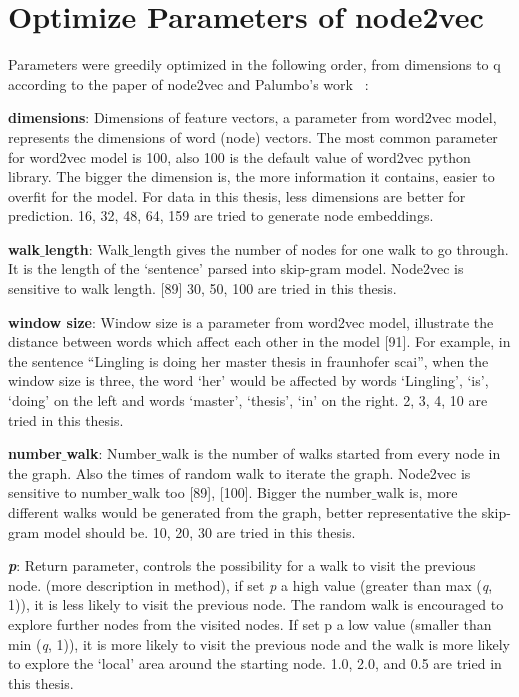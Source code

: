 \section{Optimize Parameters of node2vec} \label{op_node2vec}

Parameters were greedily optimized in the following order, from dimensions to q according to the paper of node2vec and Palumbo’s work ~\cite{gangemi_knowledge_2018}:

\textbf{dimensions}: Dimensions of feature vectors, a parameter from word2vec model, represents the dimensions of word (node) vectors. The most common parameter for word2vec model is 100, also 100 is the default value of word2vec python library. The bigger the dimension is, the more information it contains, easier to overfit for the model. For data in this thesis, less dimensions are better for prediction. 16, 32, 48, 64, 159 are tried to generate node embeddings.

\textbf{walk$\_$length}: Walk$\_$length gives the number of nodes for one walk to go through. It is the length of the ‘sentence’ parsed into skip-gram model. Node2vec is sensitive to walk length. [89] 30, 50, 100 are tried in this thesis.

\textbf{window size}: Window size is a parameter from word2vec model, illustrate the distance between words which affect each other in the model [91]. For example, in the sentence “Lingling is doing her master thesis in fraunhofer scai”, when the window size is three, the word ‘her’ would be affected by words ‘Lingling’, ‘is’, ‘doing’ on the left and words ‘master’, ‘thesis’, ‘in’ on the right. 2, 3, 4, 10 are tried in this thesis.

\textbf{number$\_$walk}: Number$\_$walk is the number of walks started from every node in the graph. Also the times of random walk to iterate the graph. Node2vec is sensitive to number$\_$walk too [89], [100]. Bigger the number$\_$walk is, more different walks would be generated from the graph, better representative the skip-gram model should be. 10, 20, 30 are tried in this thesis.

\textbf{\emph{p}}: Return parameter, controls the possibility for a walk to visit the previous node. (more description in method), if set \textit{p} a high value (greater than max (\textit{q}, 1)), it is less likely to visit the previous node. The random walk is encouraged to explore further nodes from the visited nodes. If set p a low value (smaller than min (\textit{q}, 1)), it is more likely to visit the previous node and the walk is more likely to explore the ‘local’ area around the starting node. 1.0, 2.0, and 0.5 are tried in this thesis.

